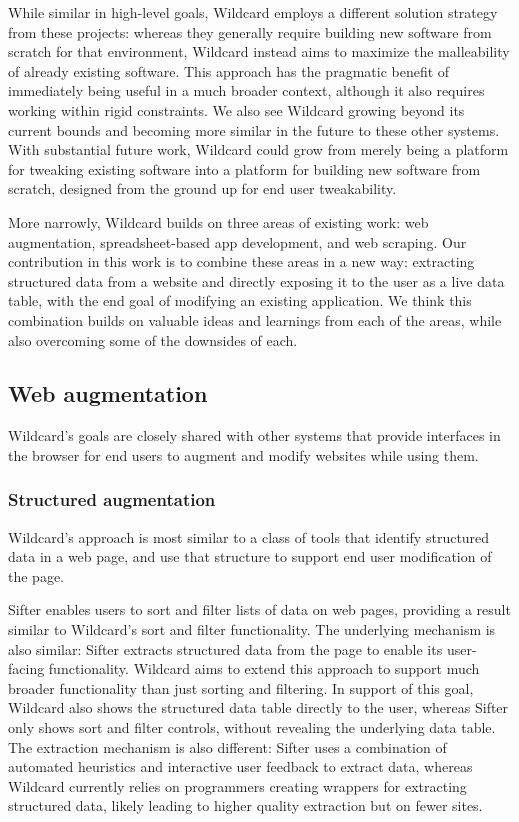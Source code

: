 \documentclass[english,submission]{programming}
\begin{document}
While similar in high-level goals, Wildcard employs a different solution
strategy from these projects: whereas they generally require building
new software from scratch for that environment, Wildcard instead aims to
maximize the malleability of already existing software. This approach
has the pragmatic benefit of immediately being useful in a much broader
context, although it also requires working within rigid constraints. We
also see Wildcard growing beyond its current bounds and becoming more
similar in the future to these other systems. With substantial future
work, Wildcard could grow from merely being a platform for tweaking
existing software into a platform for building new software from
scratch, designed from the ground up for end user tweakability.

More narrowly, Wildcard builds on three areas of existing work: web
augmentation, spreadsheet-based app development, and web scraping. Our
contribution in this work is to combine these areas in a new way:
extracting structured data from a website and directly exposing it to
the user as a live data table, with the end goal of modifying an
existing application. We think this combination builds on valuable ideas
and learnings from each of the areas, while also overcoming some of the
downsides of each.

\hypertarget{web-augmentation}{%
\subsection{Web augmentation}\label{web-augmentation}}

Wildcard's goals are closely shared with other systems that provide
interfaces in the browser for end users to augment and modify websites
while using them.

\hypertarget{structured-augmentation}{%
\subsubsection{Structured augmentation}\label{structured-augmentation}}

Wildcard's approach is most similar to a class of tools that identify
structured data in a web page, and use that structure to support end
user modification of the page.

Sifter \autocite{huynh2006} enables users to sort and filter lists of
data on web pages, providing a result similar to Wildcard's sort and
filter functionality. The underlying mechanism is also similar: Sifter
extracts structured data from the page to enable its user-facing
functionality. Wildcard aims to extend this approach to support much
broader functionality than just sorting and filtering. In support of
this goal, Wildcard also shows the structured data table directly to the
user, whereas Sifter only shows sort and filter controls, without
revealing the underlying data table. The extraction mechanism is also
different: Sifter uses a combination of automated heuristics and
interactive user feedback to extract data, whereas Wildcard currently
relies on programmers creating wrappers for extracting structured data,
likely leading to higher quality extraction but on fewer sites.
\end{document}
